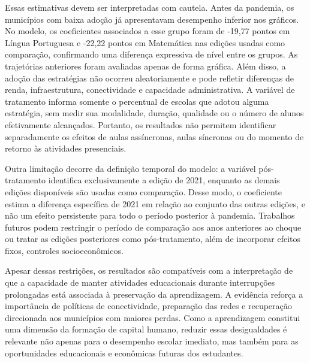 \documentclass[
	12pt,				%
	openright,			%
	oneside,			%
	a4paper,			%
	brazil,				%
	]{article}
\begin{document}
Essas estimativas devem ser interpretadas com cautela. Antes da pandemia, os
municípios com baixa adoção já apresentavam desempenho inferior nos gráficos. No
modelo, os coeficientes associados a esse grupo foram de -19,77 pontos em Língua
Portuguesa e -22,22 pontos em Matemática nas edições usadas como comparação,
confirmando uma diferença expressiva de nível entre os grupos. As trajetórias
anteriores foram avaliadas apenas de forma gráfica. Além disso, a adoção das
estratégias não ocorreu aleatoriamente e pode refletir diferenças de renda,
infraestrutura, conectividade e capacidade administrativa. A variável de
tratamento informa somente o percentual de escolas que adotou alguma estratégia,
sem medir sua modalidade, duração, qualidade ou o número de alunos efetivamente
alcançados. Portanto, os resultados não permitem identificar separadamente os
efeitos de aulas assíncronas, aulas síncronas ou do momento de retorno às
atividades presenciais.

Outra limitação decorre da definição temporal do modelo: a variável
pós-tratamento identifica exclusivamente a edição de 2021, enquanto as demais
edições disponíveis são usadas como comparação. Desse modo, o coeficiente estima
a diferença específica de 2021 em relação ao conjunto das outras edições, e não
um efeito persistente para todo o período posterior à pandemia. Trabalhos futuros
podem restringir o período de comparação aos anos anteriores ao choque ou tratar
as edições posteriores como pós-tratamento, além de incorporar efeitos fixos,
controles socioeconômicos.

Apesar dessas restrições, os resultados são compatíveis com a interpretação de
que a capacidade de manter atividades educacionais durante interrupções
prolongadas está associada à preservação da aprendizagem. A evidência reforça a
importância de políticas de conectividade, preparação das redes e recuperação
direcionada aos municípios com maiores perdas. Como a aprendizagem constitui uma
dimensão da formação de capital humano, reduzir essas desigualdades é relevante
não apenas para o desempenho escolar imediato, mas também para as oportunidades
educacionais e econômicas futuras dos estudantes.

\newpage
\printbibliography[title={\centering\MakeUppercase{Referências}}]
\end{document}
